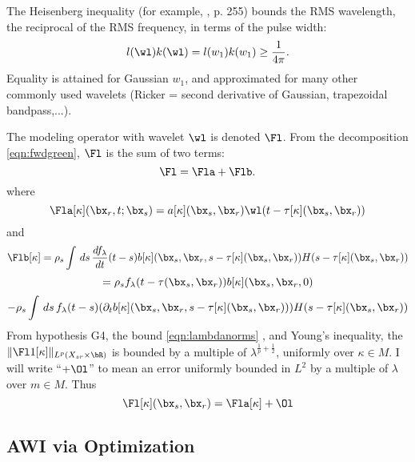The Heisenberg inequality (for example, \cite{Folland:07}, p. 255) bounds the RMS
wavelength, the reciprocal of the RMS frequency, in terms of the pulse
width:
\begin{equation}
  \label{eqn:heis}
  l(\wl) k(\wl) = l(w_1)k(w_1) \ge \frac{1}{4\pi}.
\end{equation}
Equality is attained for Gaussian $w_1$, and approximated for many other
commonly used wavelets (Ricker = second derivative of Gaussian,
trapezoidal bandpass,...).

The modeling operator with wavelet $\wl$ is denoted $\Fl$. From the
decomposition \ref{eqn:fwdgreen}, $\Fl$ is the sum of two terms:
\begin{equation}
  \label{eqn:Flamdecomp}
  \Fl = \Fla + \Flb.
\end{equation}
where
\begin{equation}
  \label{eqn:Fl0}
  \Fla[\kappa](\bx_r,t;\bx_s) =
  a[\kappa](\bx_s,\bx_r)\wl(t-\tau[\kappa](\bx_s,\bx_r))
\end{equation}
and
\[
\Flb[\kappa] = \rho_s\int
   \,ds \, \frac{df_{\lambda}}{dt}(t-s) b[\kappa](\bx_s,\bx_r,s-\tau[\kappa](\bx_s,\bx_r))H(s-\tau[\kappa](\bx_s,\bx_r))
\]
\[
  =\rho_s
  f_{\lambda}(t-\tau(\bx_s,\bx_r))b[\kappa](\bx_s,\bx_r,0)
\]
\begin{equation}
  \label{eqn:Fl1}
    -
    \rho_s\int
   \,ds \, f_{\lambda}(t-s) (\partial_t
   b[\kappa](\bx_s,\bx_r,s-\tau[\kappa](\bx_s,\bx_r)))H(s-\tau[\kappa](\bx_s,\bx_r))
\end{equation}
From hypothesis G4, the bound \ref{eqn:lambdanorms} , and Young's inequality, the $\|\Fl1[\kappa]\|_{ L^p(X_{sr} \times \bR)}$ is bounded by a multiple of
$\lambda^{\frac{1}{p}+\frac{1}{2}}$, uniformly over $\kappa \in M$.
I will write ``$+ \Ol$'' to mean an  error uniformly bounded in $L^2$ by
a multiple of $\lambda$ over $m \in M$. Thus
\begin{equation}
  \label{eqn:fwdapprox}
  \Fl[\kappa](\bx_s,\bx_r) = \Fla[\kappa] +   \Ol
\end{equation}

\subsection{AWI via Optimization}

